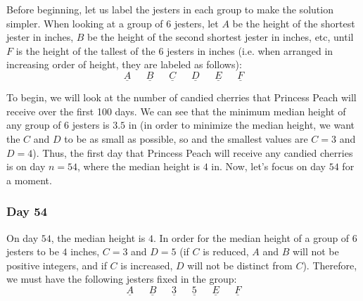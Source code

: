 \documentclass[12pt]{article}
\begin{document}

\begin{solution}{4}

    \newcommand{\jesterold}[6]{
        \underline{\text{ $#1$ }}\ 
        \underline{\text{ $#2$ }}\ 
        \underline{\text{ $#3$ }}\ 
        \underline{\text{ $#4$ }}\ 
        \underline{\text{ $#5$ }}\ 
        \underline{\text{ $#6$ }}
    }
    \newcommand{\jester}[6]{
        \underbrace{\underline{\text{ $A$ }}\ 
                    \underline{\text{ $B$ }}}_{[#3,\ #4]}\ 
        \underline{\text{ #1 }}\ \underline{\text{ #2 }}\ 
        \underbrace{\underline{\text{ $E$ }}\ 
                    \underline{\text{ $F$ }}}_{[#5,\ #6]}
    } 

    Before beginning, let us label the jesters in each group to make the solution simpler.
    When looking at a group of 6 jesters, let $A$ be the height of the shortest jester in inches,
    $B$ be the height of the second shortest jester in inches, etc, until $F$ is the height of the
    tallest of the 6 jesters in inches (i.e. when arranged in increasing order of height, they are labeled as follows):
    \begin{equation*}
        \jesterold ABCDEF
    \end{equation*}
    
    To begin, we will look at the number of candied cherries that Princess Peach will receive
    over the first 100 days. We can see that the minimum median height of any group of 6 jesters is
    $3.5\text{ in}$ (in order to minimize the median height, we want the $C$ and $D$ to be as small as possible,
    so and the smallest values are $C=3$ and $D=4$). Thus, the first day that Princess Peach will receive any candied
    cherries is on day $n=54$, where the median height is $4\text{ in}$. Now, let's focus on day $54$ for a moment.

    \subsubsection*{Day 54}
    On day $54$, the median height is $4$. In order for the median height of a group of $6$ jesters to be $4$ inches,
    $C=3$ and $D=5$ (if $C$ is reduced, $A$ and $B$ will not be positive integers, and if $C$ is increased, $D$ will
    not be distinct from $C$). Therefore, we must have the following jesters fixed in the group:
    \begin{equation*}
        \jesterold AB35EF
    \end{equation*}


\end{solution}
\end{document}
